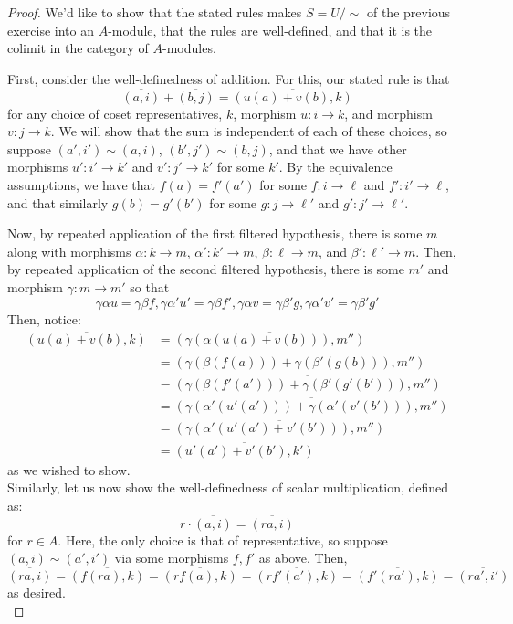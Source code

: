 \documentclass[12pt]{exam}
\begin{document}
\begin{proof}
	We'd like to show that the stated rules makes $S = U/\sim$ of the previous exercise into an $A$-module, that the rules are well-defined, and that it is the colimit in the category of $A$-modules.
	
	First, consider the well-definedness of addition. For this, our stated rule is that
	\[ \overline{(a,i)} + \overline{(b,j)} = \overline{(u(a)+v(b),k)} \]
	for any choice of coset representatives, $k$, morphism $u : i \to k$, and morphism $v : j \to k$. We will show that the sum is independent of each of these choices, so suppose $(a',i') \sim (a,i)$, $(b',j') \sim (b,j)$, and that we have other morphisms $u' : i' \to k'$ and $v' : j' \to k'$ for some $k'$. By the equivalence assumptions, we have that $f(a) = f'(a')$ for some $f : i \to \ell$ and $f' : i' \to \ell$, and that similarly $g(b) = g'(b')$ for some $g : j \to \ell'$ and $g' : j' \to \ell'$.
	
	Now, by repeated application of the first filtered hypothesis, there is some $m$ along with morphisms $\alpha : k \to m$, $\alpha' : k' \to m$, $\beta : \ell \to m$, and $\beta' : \ell' \to m$. Then, by repeated application of the second filtered hypothesis, there is some $m'$ and morphism $\gamma : m \to m'$ so that
	\[ \gamma\alpha u = \gamma\beta f, \gamma\alpha'u' = \gamma\beta f', \gamma\alpha v = \gamma\beta'g, \gamma\alpha'v' = \gamma\beta'g' \]
	Then, notice:
	\begin{align*}
	\overline{(u(a)+v(b),k)}
		&= \overline{(\gamma(\alpha(u(a)+v(b))), m'')} \\
		&= \overline{(\gamma(\beta(f(a)))+\gamma(\beta'(g(b))), m'')} \\
		&= \overline{(\gamma(\beta(f'(a')))+\gamma(\beta'(g'(b'))), m'')} \\
		&= \overline{(\gamma(\alpha'(u'(a')))+\gamma(\alpha'(v'(b'))), m'')} \\
		&= \overline{(\gamma(\alpha'(u'(a')+v'(b'))), m'')} \\
		&= \overline{(u'(a')+v'(b'),k')}
	\end{align*}
	as we wished to show. \\
	
	Similarly, let us now show the well-definedness of scalar multiplication, defined as:
	\[ r \cdot \overline{(a,i)} = \overline{(ra,i)} \]
	for $r \in A$. Here, the only choice is that of representative, so suppose $(a,i) \sim (a',i')$ via some morphisms $f,f'$ as above. Then,
	\[ \overline{(ra,i)} = \overline{(f(ra),k)} = \overline{(rf(a),k)} = \overline{(rf'(a'),k)} = \overline{(f'(ra'),k)} = \overline{(ra',i')} \]
	as desired. \\
	

\end{proof}
\end{document}
